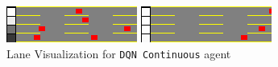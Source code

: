 \begin{figure}[H]
    \centering
    \begin{minipage}{0.48\textwidth}
        \centering
        \includegraphics[width=\linewidth]{plots/part2.2-lane_visualization_00_step_0140.png}
    \end{minipage}
    \hfill
    \begin{minipage}{0.48\textwidth}
        \centering
        \includegraphics[width=\linewidth]{plots/part2.2-lane_visualization_00_step_0380.png}
    \end{minipage}
    \caption{Lane Visualization for \texttt{DQN Continuous} agent}
    \label{fig:part2.2-lane-visualization}
\end{figure}

